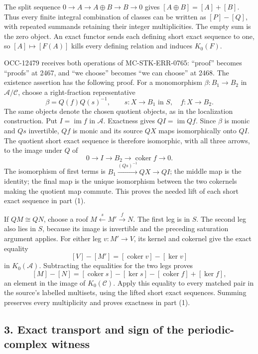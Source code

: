 \documentclass[11pt]{article}
\begin{document}
The split sequence \(0\to A\to A\oplus B\to B\to0\) gives \([A\oplus B]=[A]+[B]\). Thus every finite integral combination of classes can be written as \([P]-[Q]\), with repeated summands retaining their integer multiplicities. The empty sum is the zero object. An exact functor sends each defining short exact sequence to one, so \([A]\mapsto[F(A)]\) kills every defining relation and induces \(K_0(F)\).

OCC-12479 receives both operations of MC-STK-ERR-0765: ``proof'' becomes ``proofs'' at 2467, and ``we choose'' becomes ``we can choose'' at 2468. The existence assertion has the following proof. For a monomorphism \(\beta:B_1\to B_2\) in \(\mathcal A/\mathcal C\), choose a right-fraction representative \[
\beta=Q(f)Q(s)^{-1},\qquad s:X\to B_1\text{ in }S,\quad f:X\to B_2.
\] The same objects denote the chosen quotient objects, as in the localization construction. Put \(I=\operatorname{im}f\) in \(\mathcal A\). Exactness gives \(QI=\operatorname{im}Qf\). Since \(\beta\) is monic and \(Qs\) invertible, \(Qf\) is monic and its source \(QX\) maps isomorphically onto \(QI\). The quotient short exact sequence is therefore isomorphic, with all three arrows, to the image under \(Q\) of \[
0\longrightarrow I\longrightarrow B_2
\longrightarrow\operatorname{coker}f\longrightarrow0.
\] The isomorphism of first terms is \(B_1\xrightarrow{(Qs)^{-1}}QX\to QI\); the middle map is the identity; the final map is the unique isomorphism between the two cokernels making the quotient map commute. This proves the needed lift of each short exact sequence in part (1).

If \(QM\cong QN\), choose a roof \(M\xleftarrow{s}M'\xrightarrow{f}N\). The first leg is in \(S\). The second leg also lies in \(S\), because its image is invertible and the preceding saturation argument applies. For either leg \(v:M'\to V\), its kernel and cokernel give the exact equality \[
[V]-[M']=[\operatorname{coker}v]-[\ker v]
\] in \(K_0(\mathcal A)\). Subtracting the equalities for the two legs proves \[
[M]-[N]
=[\operatorname{coker}s]-[\ker s]
-[\operatorname{coker}f]+[\ker f],
\] an element in the image of \(K_0(\mathcal C)\). Apply this equality to every matched pair in the source's labelled multisets, using the lifted short exact sequences. Summing preserves every multiplicity and proves exactness in part (1).

\subsection{3. Exact transport and sign of the periodic-complex witness}\label{note-02-exact-transport-and-sign-of-the-periodic-complex-witness}
\end{document}
